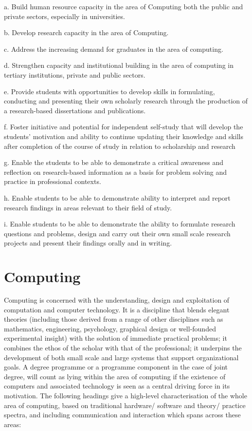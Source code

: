 \documentclass[a4paper,12pt]{article}
\begin{document}
a. Build human resource capacity in the area of Computing both the public and private sectors, especially in universities.

b. Develop research capacity in the area of Computing.

c. Address the increasing demand for graduates  in the area of computing.

d. Strengthen capacity and institutional building in the area of computing in tertiary institutions, private and public sectors.

e. Provide students with opportunities to develop skills in formulating, conducting and presenting their own scholarly research through the production of a research-based dissertations and publications.

f. Foster initiative and potential for independent self-study that will develop the students’ motivation and ability to continue updating their knowledge and skills after completion of the course of study in relation to scholarship and research

g. Enable the students to be able to demonstrate a critical awareness and reflection on research-based information as a basis for problem solving and practice in professional contexts.

h. Enable students to be able to demonstrate ability to interpret and report research findings in areas relevant to their
field of study.

i. Enable students to be able to demonstrate the ability to formulate research questions and problems, design and
carry out their own small scale research projects and present their findings orally and in writing.


\section{Computing}

Computing is concerned with the understanding, design and exploitation of computation and computer technology. It is a discipline that blends elegant theories (including those derived from a range of other disciplines such as mathematics, engineering, psychology, graphical design or well-founded experimental insight) with the solution of immediate practical problems; it combines the ethos of
the scholar with that of the professional; it underpins the development of both small scale and large systems that support organizational goals. A degree programme or a programme component in the case of joint degree, will count as lying within the area of computing if the existence of computers and associated technology is seen as a central driving force in its motivation. The following headings give a high-level characterisation of the whole area of computing, based on traditional hardware/ software and theory/ practice spectra, and including communication and interaction which spans across these areas:
\end{document}
